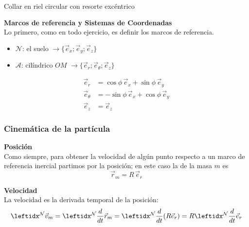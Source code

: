 \begin{solucion}{Collar en riel circular con resorte excéntrico}

\textbf{Marcos de referencia y Sistemas de Coordenadas}\\
Lo primero, como en todo ejercicio, es definir los marcos de referencia.
\begin{itemize}
    \item $\mathcal{N}$: el suelo $\longrightarrow\{\vec{e}_x;\vec{e}_y;\vec{e}_z\}$
    \item $\mathcal{A}$: cilíndrico $OM$ $\longrightarrow\{\vec{e}_r;\vec{e}_\theta;\vec{e}_z\}$
\end{itemize}

\begin{center}
\end{center}

\begin{equation*}
\begin{split}
    \vec{e}_r&=\cos\phi\,\vec{e}_x+\sin\phi\,\vec{e}_y\\
    \vec{e}_\theta&=-\sin\phi\,\vec{e}_x+\cos\phi\,\vec{e}_y\\
    \vec{e}_z&=\vec{e}_z
\end{split}
\end{equation*}

\subsubsection*{Cinemática de la partícula}
\textbf{Posición}\\
Como siempre, para obtener la velocidad de algún punto respecto a un marco de referencia inercial partimos por la posición; en este caso la de la masa $m$ es
$$\vec{r}_m=R\,\vec{e}_r$$

\textbf{Velocidad}\\
La velocidad es la derivada temporal de la posición:
$$\marc{\vec{v}_m}{N}=\der{\vec{r}_{m}}{N}=\der{(R\vec{e}_r)}{N}=R\der{\vec{e}_r}{N}{}$$



\end{solucion}
